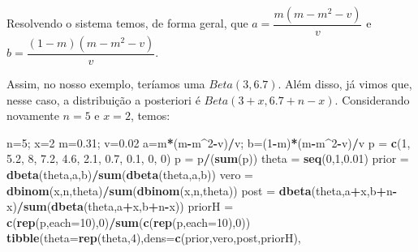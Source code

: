 \documentclass[
]{book}
\newenvironment{Shaded}{\begin{snugshade}}{\end{snugshade}}
\newcommand{\DataTypeTok}[1]{\textcolor[rgb]{0.13,0.29,0.53}{#1}}
\newcommand{\DecValTok}[1]{\textcolor[rgb]{0.00,0.00,0.81}{#1}}
\newcommand{\FloatTok}[1]{\textcolor[rgb]{0.00,0.00,0.81}{#1}}
\newcommand{\KeywordTok}[1]{\textcolor[rgb]{0.13,0.29,0.53}{\textbf{#1}}}
\newcommand{\NormalTok}[1]{#1}
\newcommand{\OperatorTok}[1]{\textcolor[rgb]{0.81,0.36,0.00}{\textbf{#1}}}
\newcommand{\StringTok}[1]{\textcolor[rgb]{0.31,0.60,0.02}{#1}}
\begin{document}
Resolvendo o sistema temos, de forma geral, que \(a=\dfrac{m(m-m^2-v)}{v}\) e \(b=\dfrac{(1-m)(m-m^2-v)}{v}\).

Assim, no nosso exemplo, teríamos uma \(Beta(3,6.7)\). Além disso, já vimos que, nesse caso, a distribuição a posteriori é \(Beta(3+x,6.7+n-x)\). Considerando novamente \(n=5\) e \(x=2\), temos:

\begin{Shaded}
\begin{Highlighting}[]
\NormalTok{n=}\DecValTok{5}\NormalTok{; x=}\DecValTok{2}
\NormalTok{m=}\FloatTok{0.31}\NormalTok{; v=}\FloatTok{0.02}
\NormalTok{a=m}\OperatorTok{*}\NormalTok{(m}\OperatorTok{-}\NormalTok{m}\OperatorTok{^}\DecValTok{2}\OperatorTok{-}\NormalTok{v)}\OperatorTok{/}\NormalTok{v; b=(}\DecValTok{1}\OperatorTok{-}\NormalTok{m)}\OperatorTok{*}\NormalTok{(m}\OperatorTok{-}\NormalTok{m}\OperatorTok{^}\DecValTok{2}\OperatorTok{-}\NormalTok{v)}\OperatorTok{/}\NormalTok{v}
\NormalTok{p =}\StringTok{ }\KeywordTok{c}\NormalTok{(}\DecValTok{1}\NormalTok{, }\FloatTok{5.2}\NormalTok{, }\DecValTok{8}\NormalTok{, }\FloatTok{7.2}\NormalTok{, }\FloatTok{4.6}\NormalTok{, }\FloatTok{2.1}\NormalTok{, }\FloatTok{0.7}\NormalTok{, }\FloatTok{0.1}\NormalTok{, }\DecValTok{0}\NormalTok{, }\DecValTok{0}\NormalTok{)}
\NormalTok{p =}\StringTok{ }\NormalTok{p}\OperatorTok{/}\NormalTok{(}\KeywordTok{sum}\NormalTok{(p))}
\NormalTok{theta =}\StringTok{ }\KeywordTok{seq}\NormalTok{(}\DecValTok{0}\NormalTok{,}\DecValTok{1}\NormalTok{,}\FloatTok{0.01}\NormalTok{)}
\NormalTok{prior =}\StringTok{ }\KeywordTok{dbeta}\NormalTok{(theta,a,b)}\OperatorTok{/}\KeywordTok{sum}\NormalTok{(}\KeywordTok{dbeta}\NormalTok{(theta,a,b))}
\NormalTok{vero =}\StringTok{ }\KeywordTok{dbinom}\NormalTok{(x,n,theta)}\OperatorTok{/}\KeywordTok{sum}\NormalTok{(}\KeywordTok{dbinom}\NormalTok{(x,n,theta))}
\NormalTok{post =}\StringTok{ }\KeywordTok{dbeta}\NormalTok{(theta,a}\OperatorTok{+}\NormalTok{x,b}\OperatorTok{+}\NormalTok{n}\OperatorTok{-}\NormalTok{x)}\OperatorTok{/}\KeywordTok{sum}\NormalTok{(}\KeywordTok{dbeta}\NormalTok{(theta,a}\OperatorTok{+}\NormalTok{x,b}\OperatorTok{+}\NormalTok{n}\OperatorTok{-}\NormalTok{x))}
\NormalTok{priorH =}\StringTok{ }\KeywordTok{c}\NormalTok{(}\KeywordTok{rep}\NormalTok{(p,}\DataTypeTok{each=}\DecValTok{10}\NormalTok{),}\DecValTok{0}\NormalTok{)}\OperatorTok{/}\KeywordTok{sum}\NormalTok{(}\KeywordTok{c}\NormalTok{(}\KeywordTok{rep}\NormalTok{(p,}\DataTypeTok{each=}\DecValTok{10}\NormalTok{),}\DecValTok{0}\NormalTok{))}
\KeywordTok{tibble}\NormalTok{(}\DataTypeTok{theta=}\KeywordTok{rep}\NormalTok{(theta,}\DecValTok{4}\NormalTok{),}\DataTypeTok{dens=}\KeywordTok{c}\NormalTok{(prior,vero,post,priorH),}

\end{Highlighting}
\end{Shaded}
\end{document}
